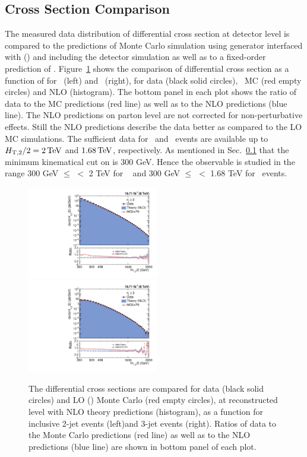 \subsection{Cross Section Comparison}
The measured data distribution of differential cross section at detector level is compared to the predictions of Monte Carlo simulation using \MadGraphF generator interfaced with \PYTHIAS (\MGP) and including the detector simulation as well as to a fixed-order prediction of \NLOJETPP. Figure~\ref{fig:comp_all} shows the comparison of differential cross section as a function of \httwo for \njt~(left) and \njth~(right), for data (black solid circles), \MGP~MC (red empty circles) and NLO (histogram). The bottom panel in each plot shows the ratio of data to the MC predictions (red line) as well as to the NLO predictions (blue line). The NLO predictions on parton level are not corrected for non-perturbative effects. Still the NLO predictions describe the data better as compared to the LO MC simulations. The sufficient data for \njt~and \njth~events are available up to $H_{\mathrm{T,2}}/2 = 2\,\text{Te\hspace{-.08em}V}$ and $1.68\,\text{Te\hspace{-.08em}V}$, respectively. As mentioned in Sec.~\ref{} \qm that the minimum kinematical cut on \httwo is 300 GeV. Hence the observable is studied in the range 300 GeV $\leq$ \httwo $<$ 2 TeV for \njt~ and   
300 GeV $\leq$ \httwo $<$ 1.68 TeV for \njth~events.

\begin{figure}[!htbp]
 \begin{center}
 \includegraphics[width=0.51\textwidth]{Plots_HT_2_150/Comparison_all_2_HT_2_150.pdf}%
 ~~\includegraphics[width=0.51\textwidth]{Plots_HT_2_150/Comparison_all_3_HT_2_150.pdf}\\
 \caption{The differential cross sections are compared for data (black solid circles) and LO \MadGraphF \plus \PYTHIAS (\MGP) Monte Carlo (red empty circles), at reconstructed level with NLO theory predictions (histogram), as a function \httwo for inclusive 2-jet events (left)and 3-jet events (right). Ratios of data to the Monte Carlo predictions (red line) as well as to the NLO predictions (blue line) are shown in bottom panel of each plot.}
 \label{fig:comp_all}
 \end{center}
\end{figure}

